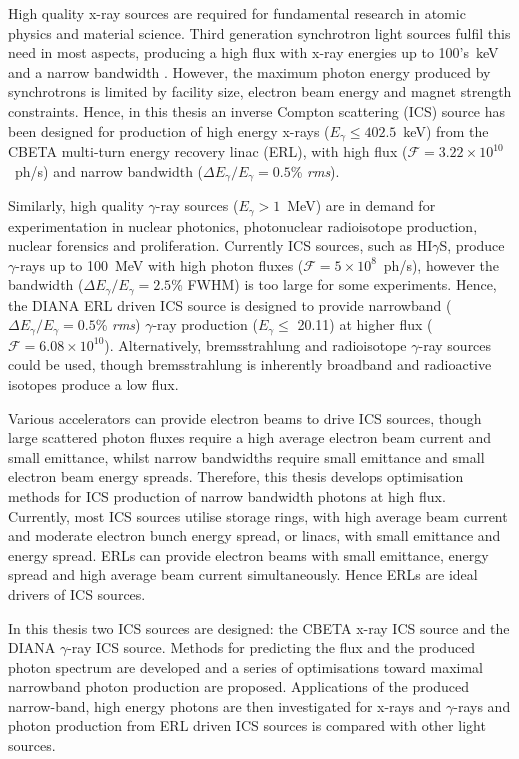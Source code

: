 \documentclass[11pt,oneside]{thesisformat}
\begin{document}
High quality x-ray sources are required for fundamental research in atomic physics and material science. Third generation synchrotron light sources fulfil this need in most aspects, producing a high flux with x-ray energies up to 100's~\si{\kilo\electronvolt} and a narrow bandwidth . However, the maximum photon energy produced by synchrotrons is limited by facility size, electron beam energy and magnet strength constraints. Hence, in this thesis an inverse Compton scattering (ICS) source has been designed for production of high energy x-rays ($E_{\gamma} \leq 402.5$~\si{\kilo\electronvolt}) from the CBETA multi-turn energy recovery linac (ERL), with high flux ($\mathcal{F} = 3.22\times 10^{10}$~ph/\si{\second}) and narrow bandwidth ($\Delta E_{\gamma}/E_{\gamma} = 0.5$\% \textit{rms}).   

Similarly, high quality $\gamma$-ray sources ($E_{\gamma} > 1$~\si{\mega\electronvolt}) are in demand for experimentation in nuclear photonics, photonuclear radioisotope production, nuclear forensics and proliferation. Currently ICS sources, such as HI$\gamma$S, produce $\gamma$-rays up to 100~\si{\mega\electronvolt} with high photon fluxes ($\mathcal{F}=5\times 10^{8}$~ph/\si{\second}), however the bandwidth ($\Delta E_{\gamma}/E_{\gamma} = 2.5$\% FWHM) is too large for some experiments. Hence, the DIANA ERL driven ICS source is designed to provide narrowband ($\Delta E_{\gamma}/E_{\gamma} = 0.5$\% \textit{rms}) $\gamma$-ray production ($E_{\gamma} \leq$ 20.11) at higher flux ($\mathcal{F} = 6.08\times 10^{10}$). Alternatively, bremsstrahlung and radioisotope $\gamma$-ray sources could be used, though bremsstrahlung is inherently broadband and radioactive isotopes produce a low flux. 

Various accelerators can provide electron beams to drive ICS sources, though large scattered photon fluxes require a high average electron beam current and small emittance, whilst narrow bandwidths require small emittance and small electron beam energy spreads. Therefore, this thesis develops optimisation methods for ICS production of narrow bandwidth photons at high flux. Currently, most ICS sources utilise storage rings, with high average beam current and moderate electron bunch energy spread, or linacs, with small emittance and energy spread. ERLs can provide electron beams with small emittance, energy spread and high average beam current simultaneously. Hence ERLs are ideal drivers of ICS sources.      

In this thesis two ICS sources are designed: the CBETA x-ray ICS source and the DIANA $\gamma$-ray ICS source. Methods for predicting the flux and the produced photon spectrum are developed and a series of optimisations toward maximal narrowband photon production are proposed. Applications of the produced narrow-band, high energy photons are then investigated for x-rays and $\gamma$-rays and photon production from ERL driven ICS sources is compared with other light sources.   
\end{document}
